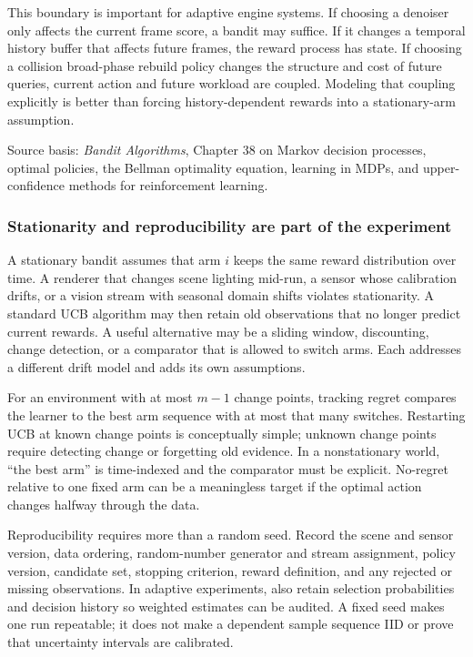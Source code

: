 This boundary is important for adaptive engine systems. If choosing a denoiser only affects the current frame score, a bandit may suffice. If it changes a temporal history buffer that affects future frames, the reward process has state. If choosing a collision broad-phase rebuild policy changes the structure and cost of future queries, current action and future workload are coupled. Modeling that coupling explicitly is better than forcing history-dependent rewards into a stationary-arm assumption.

Source basis: \emph{Bandit Algorithms}, Chapter 38 on Markov decision processes, optimal policies, the Bellman optimality equation, learning in MDPs, and upper-confidence methods for reinforcement learning.

\subsubsection{Stationarity and reproducibility are part of the experiment}\label{stationarity-and-reproducibility-are-part-of-the-experiment}

A stationary bandit assumes that arm \(i\) keeps the same reward distribution over time. A renderer that changes scene lighting mid-run, a sensor whose calibration drifts, or a vision stream with seasonal domain shifts violates stationarity. A standard UCB algorithm may then retain old observations that no longer predict current rewards. A useful alternative may be a sliding window, discounting, change detection, or a comparator that is allowed to switch arms. Each addresses a different drift model and adds its own assumptions.

For an environment with at most \(m-1\) change points, tracking regret compares the learner to the best arm sequence with at most that many switches. Restarting UCB at known change points is conceptually simple; unknown change points require detecting change or forgetting old evidence. In a nonstationary world, ``the best arm'' is time-indexed and the comparator must be explicit. No-regret relative to one fixed arm can be a meaningless target if the optimal action changes halfway through the data.

Reproducibility requires more than a random seed. Record the scene and sensor version, data ordering, random-number generator and stream assignment, policy version, candidate set, stopping criterion, reward definition, and any rejected or missing observations. In adaptive experiments, also retain selection probabilities and decision history so weighted estimates can be audited. A fixed seed makes one run repeatable; it does not make a dependent sample sequence IID or prove that uncertainty intervals are calibrated.

